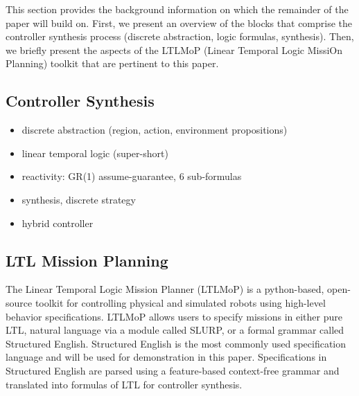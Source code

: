 This section provides the background information on which the remainder of the paper will build on. First, we present an overview of the blocks that comprise the controller synthesis process (discrete abstraction, logic formulas, synthesis). Then, we briefly present the aspects of the LTLMoP (Linear Temporal Logic MissiOn Planning) toolkit that are pertinent to this paper.

\subsection{Controller Synthesis}

\begin{itemize}
	\item discrete abstraction (region, action, environment propositions)
	\item linear temporal logic (super-short)
	\item reactivity: GR(1) assume-guarantee, 6 sub-formulas
	\item synthesis, discrete strategy
	\item hybrid controller
\end{itemize}

\subsection{LTL Mission Planning}

The Linear Temporal Logic Mission Planner (LTLMoP) \cite{Finucane2010} is a python-based, open-source toolkit for controlling physical and simulated robots using high-level behavior specifications. LTLMoP allows users to specify missions in either pure LTL, natural language via a module called SLURP, or a formal grammar called Structured English. Structured English is the most commonly used specification language and will be used for demonstration in this paper. Specifications in Structured English are parsed using a feature-based context-free grammar and translated into formulas of LTL for controller synthesis. 